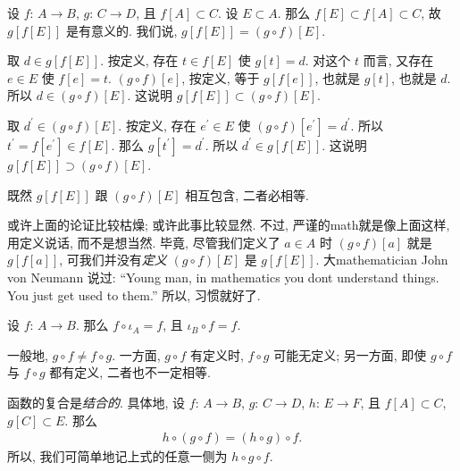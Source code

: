 \begin{remark}
    设 $f$: $A \to B$, $g$: $C \to D$,
    且 $f[A] \subset C$.
    设 $E \subset A$.
    那么 $f[E] \subset f[A] \subset C$,
    故 $g[f[E]]$ 是有意义的.
    我们说, $g[f[E]] = (g \circ f)[E]$.

    取 $d \in g[f[E]]$.
    按定义, 存在 $t \in f[E]$ 使 $g[t] = d$.
    对这个 $t$ 而言, 又存在 $e \in E$ 使 $f[e] = t$.
    $(g \circ f)[e]$, 按定义,
    等于 $g[f[e]]$, 也就是 $g[t]$, 也就是 $d$.
    所以 $d \in (g \circ f)[E]$.
    这说明 $g[f[E]] \subset (g \circ f)[E]$.

    取 $d^{\prime} \in (g \circ f)[E]$.
    按定义, 存在 $e^{\prime} \in E$ 使
    $(g \circ f)[e^{\prime}] = d^{\prime}$.
    所以 $t^{\prime} = f[e^{\prime}] \in f[E]$.
    那么 $g[t^{\prime}] = d^{\prime}$.
    所以 $d^{\prime} \in g[f[E]]$.
    这说明 $g[f[E]] \supset (g \circ f)[E]$.

    既然 $g[f[E]]$ 跟 $(g \circ f)[E]$ 相互包含,
    二者必相等.

    或许上面的论证比较枯燥;
    或许此事比较显然.
    不过, 严谨的\gls{math}就是像上面这样,
    用定义说话, 而不是想当然.
    毕竟, 尽管我们定义了
    $a \in A$ 时 $(g \circ f)[a]$ 就是 $g[f[a]]$,
    可我们并没有\emph{定义} $(g \circ f)[E]$ 是 $g[f[E]]$.
    大\gls{mathematician} John von Neumann 说过:
    ``Young man, in mathematics
    you don\textquotesingle{}t understand things.
    You just get used to them.''
    所以, 习惯就好了.
\end{remark}

\begin{remark}
    设 $f$: $A \to B$.
    那么 $f \circ \iota_A = f$,
    且 $\iota_B \circ f = f$.
\end{remark}

\begin{remark}
    一般地, $g \circ f \neq f \circ g$.
    一方面, $g \circ f$ 有定义时, $f \circ g$ 可能无定义;
    另一方面, 即使 $g \circ f$ 与 $f \circ g$ 都有定义,
    二者也不一定相等.
\end{remark}

\begin{theorem}
    函数的复合是\emph{结合的}.
    具体地, 设
    $f$: $A \to B$, $g$: $C \to D$, $h$: $E \to F$,
    且 $f[A] \subset C$, $g[C] \subset E$.
    那么
    \begin{align*}
        h \circ (g \circ f) = (h \circ g) \circ f.
    \end{align*}
    所以, 我们可简单地记上式的任意一侧为
    $h \circ g \circ f$.
\end{theorem}


